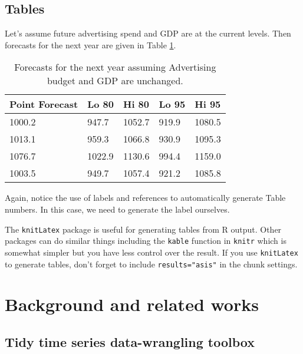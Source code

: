 \documentclass{aucklandthesis}
\begin{document}
\hypertarget{tables}{%
\section{Tables}\label{tables}}

Let's assume future advertising spend and GDP are at the current levels. Then forecasts for the next year are given in Table \ref{tab:salesforecasts}.

\begin{table}[ht]
\begin{center}
\begin{tabular}{lllll}
\toprule
Point Forecast & Lo 80 & Hi 80 & Lo 95 & Hi 95 \\
\midrule
1000.2 &  947.7 & 1052.7 & 919.9 & 1080.5 \\
1013.1 &  959.3 & 1066.8 & 930.9 & 1095.3 \\
1076.7 & 1022.9 & 1130.6 & 994.4 & 1159.0 \\
1003.5 &  949.7 & 1057.4 & 921.2 & 1085.8 \\
\bottomrule
\end{tabular}
\caption{Forecasts for the next year assuming Advertising budget and GDP are unchanged.}
\label{tab:salesforecasts}
\end{center}
\end{table}

Again, notice the use of labels and references to automatically generate Table numbers. In this case, we need to generate the label ourselves.

The \texttt{knitLatex} package is useful for generating tables from R output. Other packages can do similar things including the \texttt{kable} function in \texttt{knitr} which is somewhat simpler but you have less control over the result. If you use \texttt{knitLatex} to generate tables, don't forget to include \texttt{results="asis"} in the chunk settings.

\hypertarget{ch:litreview}{%
\chapter{Background and related works}\label{ch:litreview}}

\hypertarget{tidy-time-series-data-wrangling-toolbox}{%
\section{Tidy time series data-wrangling toolbox}\label{tidy-time-series-data-wrangling-toolbox}}
\end{document}
